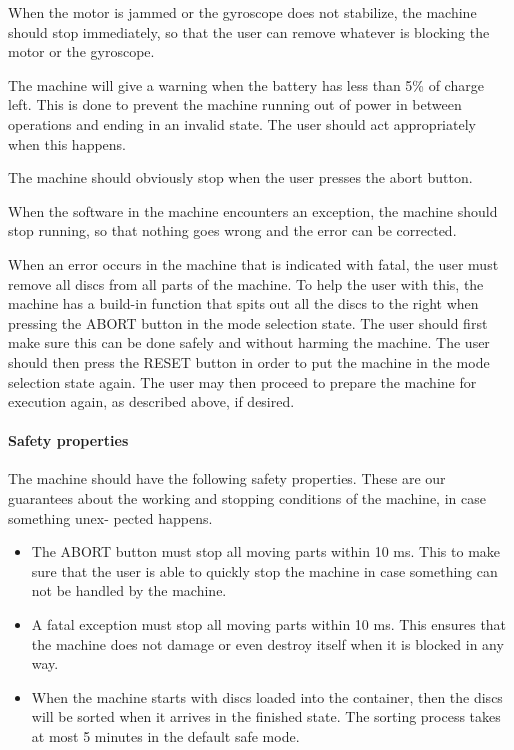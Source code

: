 \documentclass[a4paper,oneside,11pt]{article}
\begin{document}
When the motor is jammed or the gyroscope does not stabilize, the machine should stop immediately, so that the user can remove whatever is blocking the motor or the gyroscope.

The machine will give a warning when the battery has less than 5\% of charge left. This
is done to prevent the machine running out of power in between operations and ending in an
invalid state. The user should act appropriately when this happens.

The machine should obviously stop when the user presses the abort button.

When the software in the machine encounters an exception, the machine should stop running, so that nothing goes wrong and the error can be corrected.

When an error occurs in the machine that is indicated with fatal, the user must remove all
discs from all parts of the machine. To help the user with this, the machine has a build-in function that spits out all the discs to the right when pressing the ABORT  button in the mode selection state. The user should first make sure this can be done safely and without harming the machine. The user should then press the RESET button in order
to put the machine in the mode selection state again. The user may then proceed to prepare the machine for
execution again, as described above, if desired.

\paragraph{Safety properties}
The machine should have the following safety properties. These are our
guarantees about the working and stopping conditions of the machine, in case something unex-
pected happens.

\begin{itemize}
	\item The ABORT button must stop all moving parts within 10 ms. This to make sure that the user is able to quickly stop the machine in case something can not be handled by the machine.
	\item A fatal exception must stop all moving parts within 10 ms. This ensures that the machine
does not damage or even destroy itself when it is blocked in any way.
	\item When the machine starts with discs loaded into the container, then the discs will be sorted
when it arrives in the finished state. The sorting process takes at most 5 minutes in the
default safe mode.
\end{itemize}
\end{document}
